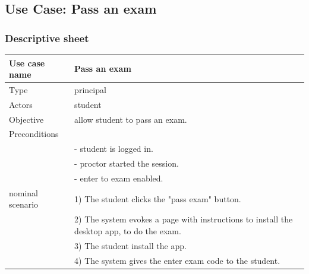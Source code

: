 \documentclass[]{uc2pfecaneva}
\begin{document}
\begin{table}[h]
	\raggedright\subsection{Use Case: Pass an exam}
	\subsubsection{Descriptive sheet}
	\centering
	\begin{tabularx}{\textwidth}{|l|X|}
		\hline
		Use case name         & Pass an exam                                                                            \\ \hline
		Type                  & principal                                                                                         \\ \hline
		Actors                & student                                                                                           \\ \hline
		Objective             & allow student to pass an exam.                                                                    \\ \hline
		Preconditions         &                                                                                                   \\
		                      & - student is logged in.                                                                           \\
		                      & - proctor started the session.                                                                    \\
		                      & - enter to exam enabled.                                                                          \\ \hline
		nominal scenario
		                      & 1) The student clicks the "pass exam" button.                                                     \\
		                      & 2) The system evokes a page with instructions to install the desktop app, to do the exam.         \\
		                      & 3) The student install the app.                                                                   \\
		                      & 4) The system gives the enter exam code to the student.                                           \\

\end{tabularx}
\end{table}
\end{document}
